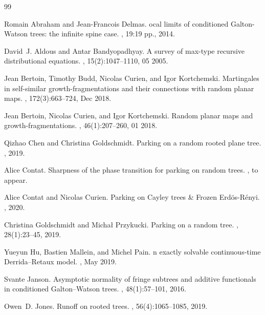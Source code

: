 \begin{thebibliography}{99}


Romain Abraham and Jean-Fran{c}ois Delmas.
ocal limits of conditioned {G}alton-{W}atson trees: the infinite
  spine case.
, 19:19 pp., 2014.

David~J. Aldous and Antar Bandyopadhyay.
\newblock A survey of max-type recursive distributional equations.
, 15(2):1047--1110, 05 2005.

Jean Bertoin, Timothy Budd, Nicolas Curien, and Igor Kortchemski.
\newblock Martingales in self-similar growth-fragmentations and their
  connections with random planar maps.
, 172(3):663--724, Dec
  2018.

Jean Bertoin, Nicolas Curien, and Igor Kortchemski.
\newblock Random planar maps and growth-fragmentations.
, 46(1):207--260, 01 2018.

Qizhao Chen and Christina Goldschmidt.
\newblock Parking on a random rooted plane tree.
, 2019.




Alice Contat.
\newblock Sharpness of the phase transition for parking on random trees.
, to appear.



Alice Contat and Nicolas Curien.
\newblock Parking on Cayley trees \& Frozen Erd\"os-R\'enyi.
, 2020.



Christina Goldschmidt and Michał Przykucki.
\newblock Parking on a random tree.
, 28(1):23–45, 2019.

Yueyun Hu, Bastien Mallein, and Michel Pain.
n exactly solvable continuous-time {D}errida--{R}etaux model.
, May 2019.

Svante Janson.
\newblock Asymptotic normality of fringe subtrees and additive functionals in
  conditioned {G}alton–{W}atson trees.
, 48(1):57--101, 2016.

Owen~D. Jones.
\newblock Runoff on rooted trees.
, 56(4):1065--1085, 2019.


\end{thebibliography}
